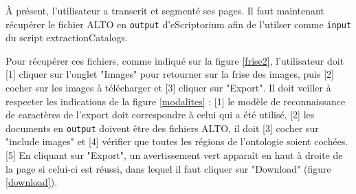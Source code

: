 \documentclass[a4paper,12pt,twoside]{book}
\begin{document}
À présent, l'utilisateur a transcrit et segmenté ses pages. Il faut maintenant récupérer le fichier ALTO en \texttt{output} d'eScriptorium afin de l'utilser comme \texttt{input} du script extractionCatalogs.

Pour récupérer ces fichiers, comme indiqué sur la figure \ref{frise2}, l'utilisateur doit [1] cliquer sur l'onglet "Images" pour retourner sur la frise des images, puis [2] cocher sur les images à télécharger et [3] cliquer sur "Export". Il doit veiller à respecter les indications de la figure \ref{modalites} : [1] le modèle de reconnaissance de caractères de l'export doit correspondre à celui qui a été utilisé, [2] les documents en \texttt{output} doivent être des fichiers ALTO, il doit [3] cocher sur "include images" et [4] vérifier que toutes les régions de l'ontologie soient cochées. [5] En cliquant sur "Export", un avertissement vert apparaît en haut à droite de la page si celui-ci est réussi, dans lequel il faut cliquer sur "Download" (figure \ref{download}).
\end{document}
